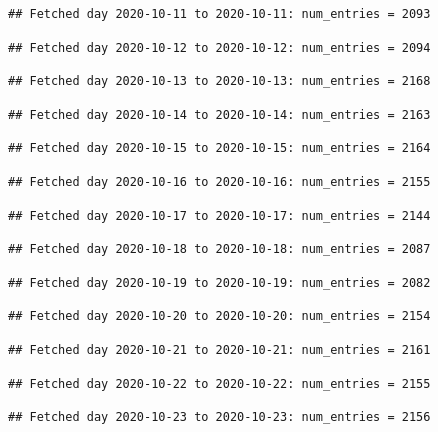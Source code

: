 \documentclass[]{article}
\begin{document}
\begin{verbatim}
## Fetched day 2020-10-11 to 2020-10-11: num_entries = 2093
\end{verbatim}

\begin{verbatim}
## Fetched day 2020-10-12 to 2020-10-12: num_entries = 2094
\end{verbatim}

\begin{verbatim}
## Fetched day 2020-10-13 to 2020-10-13: num_entries = 2168
\end{verbatim}

\begin{verbatim}
## Fetched day 2020-10-14 to 2020-10-14: num_entries = 2163
\end{verbatim}

\begin{verbatim}
## Fetched day 2020-10-15 to 2020-10-15: num_entries = 2164
\end{verbatim}

\begin{verbatim}
## Fetched day 2020-10-16 to 2020-10-16: num_entries = 2155
\end{verbatim}

\begin{verbatim}
## Fetched day 2020-10-17 to 2020-10-17: num_entries = 2144
\end{verbatim}

\begin{verbatim}
## Fetched day 2020-10-18 to 2020-10-18: num_entries = 2087
\end{verbatim}

\begin{verbatim}
## Fetched day 2020-10-19 to 2020-10-19: num_entries = 2082
\end{verbatim}

\begin{verbatim}
## Fetched day 2020-10-20 to 2020-10-20: num_entries = 2154
\end{verbatim}

\begin{verbatim}
## Fetched day 2020-10-21 to 2020-10-21: num_entries = 2161
\end{verbatim}

\begin{verbatim}
## Fetched day 2020-10-22 to 2020-10-22: num_entries = 2155
\end{verbatim}

\begin{verbatim}
## Fetched day 2020-10-23 to 2020-10-23: num_entries = 2156
\end{verbatim}
\end{document}
